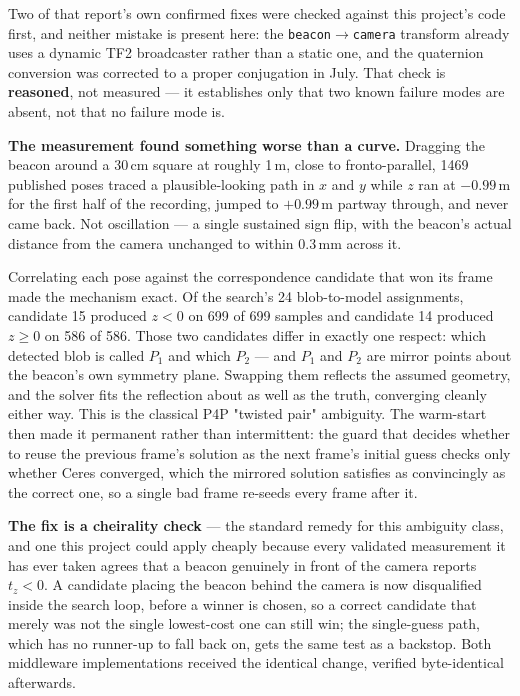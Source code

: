 \documentclass[11pt]{article}
\begin{document}
Two of that report's own confirmed fixes were checked against this
project's code first, and neither mistake is present here: the
\texttt{beacon}$\rightarrow$\texttt{camera} transform already uses a
dynamic TF2 broadcaster rather than a static one, and the quaternion
conversion was corrected to a proper conjugation in July. That check is
\textbf{reasoned}, not measured --- it establishes only that two known
failure modes are absent, not that no failure mode is.

\textbf{The measurement found something worse than a curve.} Dragging the
beacon around a 30\,cm square at roughly 1\,m, close to fronto-parallel,
1469 published poses traced a plausible-looking path in $x$ and $y$ while
$z$ ran at $-0.99$\,m for the first half of the recording, jumped to
$+0.99$\,m partway through, and never came back. Not oscillation --- a
single sustained sign flip, with the beacon's actual distance from the
camera unchanged to within 0.3\,mm across it.

Correlating each pose against the correspondence candidate that won its
frame made the mechanism exact. Of the search's 24 blob-to-model
assignments, candidate 15 produced $z<0$ on 699 of 699 samples and
candidate 14 produced $z\geq0$ on 586 of 586. Those two candidates differ
in exactly one respect: which detected blob is called $P_1$ and which
$P_2$ --- and $P_1$ and $P_2$ are mirror points about the beacon's own
symmetry plane. Swapping them reflects the assumed geometry, and the
solver fits the reflection about as well as the truth, converging cleanly
either way. This is the classical P4P "twisted pair" ambiguity. The
warm-start then made it permanent rather than intermittent: the guard that
decides whether to reuse the previous frame's solution as the next
frame's initial guess checks only whether Ceres converged, which the
mirrored solution satisfies as convincingly as the correct one, so a
single bad frame re-seeds every frame after it.

\textbf{The fix is a cheirality check} --- the standard remedy for this
ambiguity class, and one this project could apply cheaply because every
validated measurement it has ever taken agrees that a beacon genuinely in
front of the camera reports $t_z<0$. A candidate placing the beacon behind
the camera is now disqualified inside the search loop, before a winner is
chosen, so a correct candidate that merely was not the single lowest-cost
one can still win; the single-guess path, which has no runner-up to fall
back on, gets the same test as a backstop. Both middleware
implementations received the identical change, verified byte-identical
afterwards.
\end{document}

